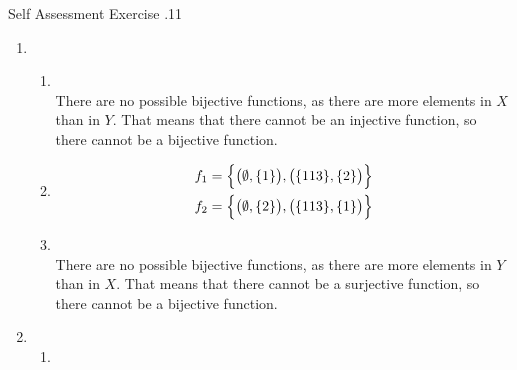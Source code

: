 \documentclass[../notes.tex]{subfiles}
\begin{document}
			\begin{exercise}{Self Assessment Exercise \thechapter.11}
				\begin{enumerate}
					\item {}
						\begin{enumerate}[label=(\alph*)]
							\item {}\\
								There are no possible bijective functions, as there are more elements in $X$ than in $Y$. That means that there cannot be an injective function, so there cannot be a bijective function.
							\item {}
								\begin{align*}
									f_{1} &= \Bigl\{\bigl(\emptyset, \{1\}\bigr), \bigl(\{113\}, \{2\}\bigr)\Bigr\}\\
									f_{2} &= \Bigl\{\bigl(\emptyset, \{2\}\bigr), \bigl(\{113\}, \{1\}\bigr)\Bigr\}
								\end{align*}
							\item {}\\
								There are no possible bijective functions, as there are more elements in $Y$ than in $X$. That means that there cannot be a surjective function, so there cannot be a bijective function.
						\end{enumerate}
					\item {}
						\begin{enumerate}[label=(\alph*)]
							\item {}
\end{enumerate}
\end{enumerate}
\end{exercise}
\end{document}
